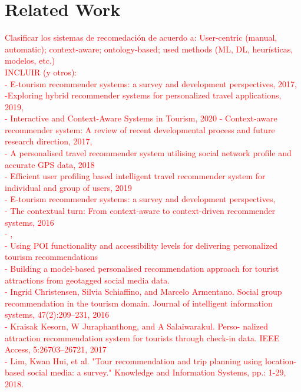 \section{Related Work}

\textcolor{red}{Clasificar los sistemas de recomedación de acuerdo a: User-centric (manual, automatic); context-aware; ontology-based; used methods (ML, DL, heurísticas, modelos, etc.)\\
INCLUIR (y otros):\\
- E-tourism recommender systems: a survey and development perspectives, 2017, \cite{artemenko2017tourism}\\
-Exploring hybrid recommender systems for personalized travel applications, 2019, \cite{logesh2019exploring}\\
- Interactive and Context-Aware Systems in Tourism, 2020
- Context-aware recommender system: A review of recent developmental process and future research direction, 2017,\\ 
- A personalised travel recommender system utilising social network profile and accurate GPS data, 2018\\
- Efficient user profiling based intelligent travel recommender system for individual and group of users, 2019\\
- E-tourism recommender systems: a survey and development perspectives,\\
- The contextual turn: From context-aware to context-driven recommender systems, 2016\\
- \cite{adomavicius2011context,rajaonarivo2019recommendation},\\
- Using POI functionality and accessibility levels for delivering personalized tourism recommendations\\
- Building a model-based personalised recommendation approach
for tourist attractions from geotagged social media data.\\
- Ingrid Christensen, Silvia Schiaffino, and Marcelo Armentano.
Social group recommendation in the tourism domain. Journal
of intelligent information systems, 47(2):209–231, 2016\\
- Kraisak Kesorn, W Juraphanthong, and A Salaiwarakul. Perso-
nalized attraction recommendation system for tourists through
check-in data. IEEE Access, 5:26703–26721, 2017\\
- Lim, Kwan Hui, et al. "Tour recommendation and trip planning using location-based social media: a survey."
Knowledge and Information Systems, pp.: 1-29, 2018.
}

